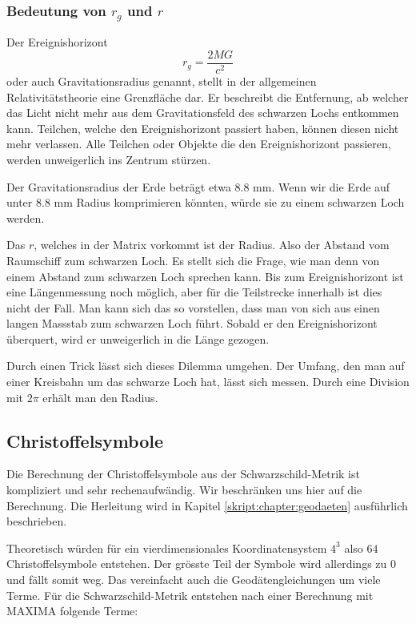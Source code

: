 \begin{refsection}
	\subsubsection{Bedeutung von $r_{g}$ und $r$}
 	Der Ereignishorizont 
%
%
     \begin{equation} \label{Gravitationsradius}
     r_{g}= \frac{2MG}{c^2}
     \end{equation}
     oder auch Gravitationsradius genannt, stellt in der allgemeinen Relativitätstheorie eine Grenzfläche dar. Er beschreibt die Entfernung, ab welcher das Licht nicht mehr aus dem Gravitationsfeld des schwarzen Lochs entkommen kann. Teilchen, welche den Ereignishorizont passiert haben, können diesen nicht mehr verlassen. Alle Teilchen oder Objekte die den Ereignishorizont passieren, werden unweigerlich ins Zentrum stürzen. 
	
	Der Gravitationsradius der Erde beträgt etwa 8.8 mm. Wenn wir die Erde auf unter 8.8 mm Radius komprimieren könnten, würde sie zu einem schwarzen Loch werden.
    
    Das $r$, welches in der Matrix vorkommt ist der Radius. Also der Abstand vom Raumschiff zum schwarzen Loch. Es stellt sich die Frage, wie man denn von einem Abstand zum schwarzen Loch sprechen kann. Bis zum Ereignishorizont ist eine Längenmessung noch möglich, aber für die Teilstrecke innerhalb ist dies nicht der Fall. Man kann sich das so vorstellen, dass man von sich aus einen langen Massstab zum schwarzen Loch führt. Sobald er den Ereignishorizont überquert, wird er unweigerlich in die Länge gezogen.
    
    Durch einen Trick lässt sich dieses Dilemma umgehen. Der Umfang, den man auf einer Kreisbahn um das schwarze Loch hat, lässt sich messen. Durch eine Division mit $2\pi$ erhält man den Radius.
	
	\subsection{Christoffelsymbole}\label{skript:chapter:zeitreisen:christoffel}
%
	
	Die Berechnung der Christoffelsymbole aus der Schwarzschild-Metrik ist kompliziert und sehr rechenaufwändig. Wir beschränken uns hier auf die Berechnung. Die Herleitung wird in Kapitel \ref{skript:chapter:geodaeten} ausführlich beschrieben. 
	
	Theoretisch würden für ein vierdimensionales Koordinatensystem $4^{3}$ also $64$ Christoffelsymbole entstehen. Der grösste Teil der Symbole wird allerdings zu $0$ und fällt somit weg. Das vereinfacht auch die Geodätengleichungen um viele Terme. 
	Für die Schwarzschild-Metrik entstehen nach einer Berechnung mit MAXIMA folgende Terme:
%
	

\end{refsection}
